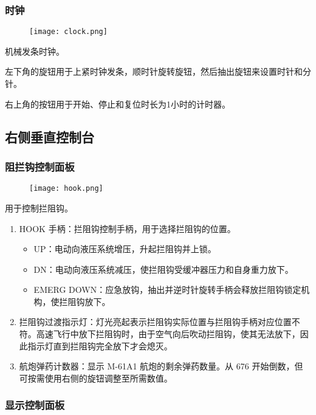 \subsubsection{时钟}

\begin{figure}[htb]
	\centering
	\texttt{[image: clock.png]}
\end{figure}
机械发条时钟。

左下角的旋钮用于上紧时钟发条，顺时针旋转旋钮，然后抽出旋钮来设置时针和分针。

右上角的按钮用于开始、停止和复位时长为1小时的计时器。

\subsection{右侧垂直控制台}

\subsubsection{阻拦钩控制面板}

\begin{figure}[htb]
	\centering
	\texttt{[image: hook.png]}
\end{figure}
用于控制拦阻钩。

\begin{enumerate}
	\item HOOK 手柄：拦阻钩控制手柄，用于选择拦阻钩的位置。
	      \begin{itemize}
		      \item UP：电动向液压系统增压，升起拦阻钩并上锁。
		      \item DN：电动向液压系统减压，使拦阻钩受缓冲器压力和自身重力放下。
		      \item EMERG DOWN：应急放钩，抽出并逆时针旋转手柄会释放拦阻钩锁定机构，使拦阻钩放下。
	      \end{itemize}
	\item 拦阻钩过渡指示灯：灯光亮起表示拦阻钩实际位置与拦阻钩手柄对应位置不符。高速飞行中放下拦阻钩时，由于空气向后吹动拦阻钩，使其无法放下，因此指示灯直到拦阻钩完全放下才会熄灭。
	\item 航炮弹药计数器：显示 M-61A1 航炮的剩余弹药数量。从 676 开始倒数，但可按需使用右侧的旋钮调整至所需数值。
\end{enumerate}

\subsubsection{显示控制面板}


